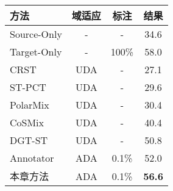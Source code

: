 \begin{table}[H]
	\renewcommand{\arraystretch}{1}
    \centering
    \setlength{\tabcolsep}{10mm}
    \label{tab:3-2}
    \wuhao
    \begin{tabular}{lccc}
        \toprule[1.5pt]
        \textbf{方法} & \textbf{域适应} & \textbf{标注} & \textbf{结果} \\
        \midrule
        Source-Only   & -           & -       & 34.6 \\
        Target-Only   & -           & 100\%       & 58.0 \\
        CRST          & UDA & -       & 27.1 \\
        ST-PCT        & UDA & -       & 29.6 \\
        PolarMix      & UDA & -       & 30.4 \\
        CoSMix        & UDA & -       & 40.4 \\
        DGT-ST        & UDA & -       & 50.8 \\
        Annotator     & ADA   & 0.1\%     & 52.0 \\
        本章方法       & ADA   & 0.1\%     & \textbf{56.6} \\
        \bottomrule[1.5pt]
    \end{tabular}
\end{table}
